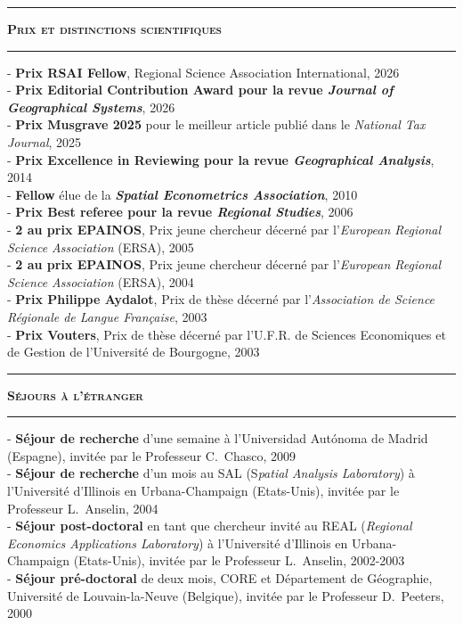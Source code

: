 \documentclass[a4paper,12pt]{article}
\newcommand{\titre}[1]{%
	\bigskip
	\noindent \rule[2mm]{\textwidth}{0.5pt}
	\textbf{\textsc{\large #1}} \\
	\noindent \rule[1mm]{\textwidth}{0.5pt}
	}
\begin{document}

\titre{Prix et distinctions scientifiques}

\noindent - \textbf{Prix RSAI Fellow}, Regional Science Association International,  2026 \\
- \textbf{Prix \og{}Editorial Contribution Award\fg{} pour la revue \textit{Journal of Geographical Systems}}, 2026 \\
- \textbf{Prix Musgrave 2025} pour le meilleur article publié dans le \textit{National Tax Journal}, 2025 \\
- \textbf{Prix \og{}Excellence in Reviewing\fg{} pour la revue \textit{Geographical Analysis}}, 2014 \\
- \textbf{Fellow} élue de la \textbf{\textit{Spatial Econometrics Association}}, 2010 \\
- \textbf{Prix \og{}Best referee\fg{} pour la revue \textit{Regional Studies}}, 2006 \\
- \textbf{2\ieme{} au prix EPAINOS}, Prix jeune chercheur décerné par l'\textit{European Regional Science Association} (ERSA), 2005 \\%
- \textbf{2\ieme{} au prix EPAINOS}, Prix jeune chercheur décerné par l'\textit{European Regional Science Association} (ERSA), 2004 \\%
- \textbf{Prix Philippe Aydalot}, Prix de thèse décerné par l'\textit{Association de Science Régionale de Langue Française}, 2003 \\
- \textbf{Prix Vouters}, Prix de thèse décerné par l'U.F.R. de Sciences Economiques et de Gestion de l'Université de Bourgogne, 2003


\titre{Séjours à l'étranger}

\noindent - \textbf{Séjour de recherche} d'une semaine à l'Universidad Autónoma de Madrid (Espagne), invitée par le Professeur C.~Chasco, 2009 \\
- \textbf{Séjour de recherche} d'un mois au SAL (S\textit{patial Analysis Laboratory}) à l'Université d'Illinois en Urbana-Champaign (Etats-Unis), invitée par le Professeur L.~Anselin, 2004 \\
- \textbf{Séjour post-doctoral} en tant que chercheur invité au REAL (\textit{Regional Economics Applications Laboratory}) à l'Université d'Illinois en Urbana-Champaign (Etats-Unis), invitée par le Professeur L.~Anselin, 2002-2003 \\
- \textbf{Séjour pré-doctoral} de deux mois, CORE et Département de Géographie, Université de Louvain-la-Neuve (Belgique), invitée par le Professeur D.~Peeters, 2000
\end{document}
